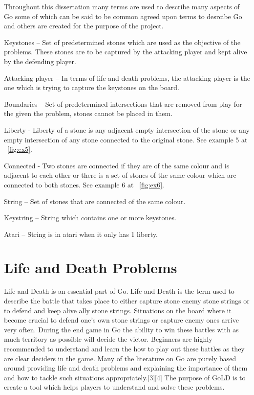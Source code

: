 \documentclass{l4proj}
\begin{document}
Throughout this dissertation many terms are used to describe many aspects of Go some of which can be said to be common agreed upon terms to desrcibe Go and others are created for the purpose of the project.

\noindent Keystones – Set of predetermined stones which are used as the objective of the problems. These stones are to be captured by the attacking player and kept alive by the defending player.



\noindent Attacking player – In terms of life and death problems, the attacking player is the one which is trying to capture the keystones on the board.

\noindent Boundaries – Set of predetermined intersections that are removed from play for the given the problem, stones cannot be placed in them.

\noindent Liberty -  Liberty of a stone is any adjacent empty intersection of the stone or any empty intersection of any stone connected to the original stone. See example 5 at ~\autoref{fig:ex5}.

\noindent Connected - Two stones are connected if they are of the same colour and is adjacent to each other or there is a set of stones of the same colour which are connected to both stones. See example 6 at ~\autoref{fig:ex6}.

\noindent String – Set of stones that are connected of the same colour.

\noindent Keystring – String which contains one or more keystones.

\noindent Atari – String is in atari when it only has 1 liberty.


\section{Life and Death Problems}

Life and Death is an essential part of Go. Life and Death is the term used to describe the battle that takes place to either capture stone enemy stone strings or to defend and keep alive ally stone strings. Situations on the board where it become crucial to defend one’s own stone strings or capture enemy ones arrive very often. During the end game in Go the ability to win these battles with as much territory as possible will decide the victor. Beginners are highly recommended to understand and  learn the how to play out these battles as they are clear deciders in the game. Many of the literature on Go are purely based around providing life and death problems  and explaining the importance of them and how to tackle such situations appropriately.[3][4] The purpose of GoLD is to create a tool which helps players to understand and solve these problems.
\end{document}
